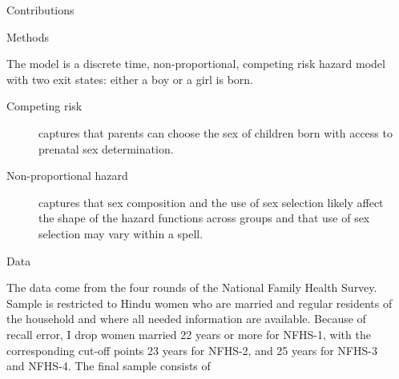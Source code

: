 \documentclass[final]{beamer}
\newlength{\onecolwid}
\newlength{\twocolwid}
\begin{document}
\begin{frame}{}
\begin{columns}[t]
\begin{column}{\onecolwid}
\begin{alertblock}{Contributions}
\end{alertblock}


\begin{block}{Methods}


The model is a discrete time, non-proportional, competing risk 
hazard model with two exit states: either a boy or a girl is born.
\begin{description}
\item[Competing risk] captures that
parents can choose the sex of children born with access to prenatal 
sex determination.
\item[Non-proportional hazard] captures that sex composition and 
the use of sex selection likely affect the shape of the hazard 
functions across groups and that use of sex selection may vary
within a spell.
\end{description}

\end{block}

\begin{block}{Data}

The data come from the four rounds of the National Family Health Survey.
Sample is restricted to Hindu women who are married and regular residents of
the household and where all needed information are available.
Because of recall error, I drop women married 22 years or more 
for NFHS-1, with the corresponding cut-off points 23 years for NFHS-2, 
and 25 years for NFHS-3 and NFHS-4.
The final sample consists of 


\end{block}



\end{column}



\begin{column}{\twocolwid}


\end{column}
\end{columns}
\end{frame}
\end{document}
